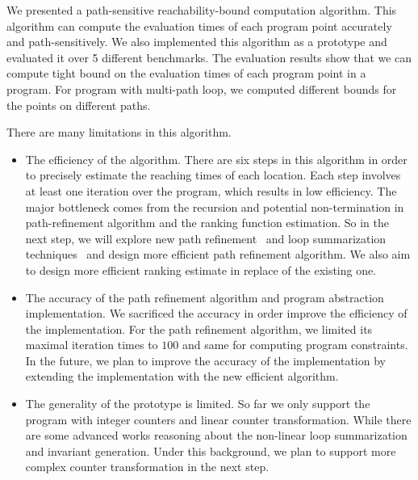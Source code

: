 We presented a path-sensitive reachability-bound computation algorithm.
This algorithm can compute the evaluation times of each program point accurately and path-sensitively.
We also implemented this algorithm as a prototype and evaluated it over 5 different benchmarks.
The evaluation results show that we can compute tight bound on the evaluation times of each program point in a program. For program with multi-path loop, we computed different bounds for the points on different paths.

There are many limitations in this algorithm.
\begin{itemize}
    \item The efficiency of the algorithm.
    There are six steps in this algorithm in order to precisely estimate the reaching times of each location. Each step involves at least one iteration over the program, which results in low efficiency.
    The major bottleneck comes from the recursion and potential non-termination in path-refinement algorithm and the ranking function estimation. So in the next step, we will explore new path refinement~\cite{CyphertBKR19} and loop summarization techniques~\cite{BreckCKR20,KincaidBCR19,KincaidCBR18} and design more efficient path refinement algorithm. We also aim to design more efficient ranking estimate in replace of the existing one.
    \item The accuracy of the path refinement algorithm and program abstraction implementation.
    We sacrificed the accuracy in order improve the efficiency of the implementation. For the path refinement algorithm,
    we limited its maximal iteration times to $100$ and same for computing program constraints. In the future, we plan to improve the accuracy of the implementation by extending the implementation with the new efficient algorithm.
    \item The generality of the prototype is limited. So far we only support the program with integer counters and linear counter transformation. While there are some advanced works reasoning about the non-linear loop summarization and invariant generation. Under this background, we plan to support more complex counter transformation in the next step.
\end{itemize}
